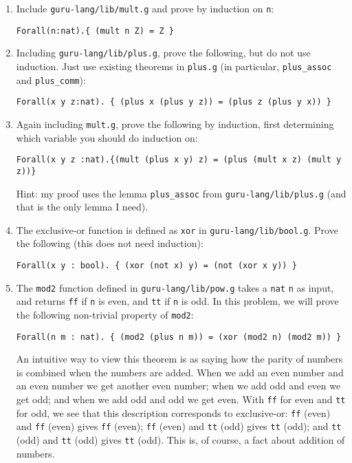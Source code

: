 \documentclass{book}[12pt]
\begin{document}
\begin{enumerate}

\item Include \texttt{guru-lang/lib/mult.g} and prove by induction on
\texttt{n}:

\begin{verbatim}
Forall(n:nat).{ (mult n Z) = Z }
\end{verbatim}

\item Including \texttt{guru-lang/lib/plus.g}, prove the following,
but do not use induction.  Just use existing theorems in \texttt{plus.g}
(in particular, \texttt{plus\_assoc} and \texttt{plus\_comm}):

\begin{verbatim}
Forall(x y z:nat). { (plus x (plus y z)) = (plus z (plus y x)) }
\end{verbatim}

\item Again including \texttt{mult.g}, prove the following by induction, first
determining which variable you should do induction on:

\begin{verbatim}
Forall(x y z :nat).{(mult (plus x y) z) = (plus (mult x z) (mult y z))}
\end{verbatim}

Hint: my proof uses the lemma \texttt{plus\_assoc} from \texttt{guru-lang/lib/plus.g}
(and that is the only lemma I need).

\item The exclusive-or function is defined as \texttt{xor} in \texttt{guru-lang/lib/bool.g}.
Prove the following (this does not need induction):

\begin{verbatim}
Forall(x y : bool). { (xor (not x) y) = (not (xor x y)) } 
\end{verbatim}

\item The \texttt{mod2} function defined in
\texttt{guru-lang/lib/pow.g} takes a \texttt{nat} \texttt{n} as input,
and returns \texttt{ff} if \texttt{n} is even, and \texttt{tt} if
\texttt{n} is odd.  In this problem, we will prove the following non-trivial
property of \texttt{mod2}:

\begin{verbatim}
Forall(n m : nat). { (mod2 (plus n m)) = (xor (mod2 n) (mod2 m)) }
\end{verbatim}

\noindent An intuitive way to view this theorem is as saying how the
parity of numbers is combined when the numbers are added.  When we add
an even number and an even number we get another even number; when we
add odd and even we get odd; and when we add odd and odd we get even.
With \texttt{ff} for even and \texttt{tt} for odd, we see that this
description corresponds to exclusive-or: \texttt{ff} (even) and
\texttt{ff} (even) gives \texttt{ff} (even); \texttt{ff} (even) and
\texttt{tt} (odd) gives \texttt{tt} (odd); and \texttt{tt} (odd) and
\texttt{tt} (odd) gives \texttt{tt} (odd).  This is, of course, a fact
about addition of numbers.


\end{enumerate}
\end{document}
